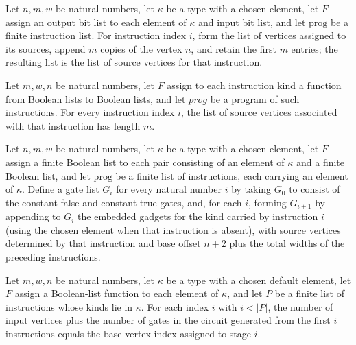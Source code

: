 \begin{definition}
\label{BoolCircuit.srcVertices}
\leanok
{}
Let $n,m,w$ be natural numbers, let $\kappa$ be a type with a chosen element, let $F$
assign an output bit list to each element of $\kappa$ and input bit list, and let
$\mathrm{prog}$ be a finite instruction list. For instruction index $i$, form the list of
vertices assigned to its sources, append $m$ copies of the vertex $n$, and retain the
first $m$ entries; the resulting list is the list of source vertices for that
instruction.
\end{definition}

\begin{theorem}
\label{BoolCircuit.length_srcVertices}
\leanok
{}
Let $m,w,n$ be natural numbers, let $F$ assign to each instruction kind a function from
Boolean lists to Boolean lists, and let $prog$ be a program of such instructions. For
every instruction index $i$, the list of source vertices associated with that
instruction has length $m$.
\end{theorem}

\begin{definition}
\label{BoolCircuit.progGates}
\leanok
{}
Let $n,m,w$ be natural numbers, let $\kappa$ be a type with a chosen element, let $F$
assign a finite Boolean list to each pair consisting of an element of $\kappa$ and a
finite Boolean list, and let $\mathrm{prog}$ be a finite list of instructions, each
carrying an element of $\kappa$. Define a gate list $G_i$ for every natural number $i$
by taking $G_0$ to consist of the constant-false and constant-true gates, and, for each
$i$, forming $G_{i+1}$ by appending to $G_i$ the embedded gadgets for the kind carried
by instruction $i$ (using the chosen element when that instruction is absent), with
source vertices determined by that instruction and base offset $n+2$ plus the total
widths of the preceding instructions.
\end{definition}

\begin{theorem}
\label{BoolCircuit.length_progGates}
\leanok
{}
Let $m,w,n$ be natural numbers, let $\kappa$ be a type with a chosen default element, let $F$
assign a Boolean-list function to each element of $\kappa$, and let $P$ be a finite list of
instructions whose kinds lie in $\kappa$. For each index $i$ with $i<|P|$, the number of
input vertices plus the number of gates in the circuit generated from the first $i$
instructions equals the base vertex index assigned to stage $i$.
\end{theorem}

